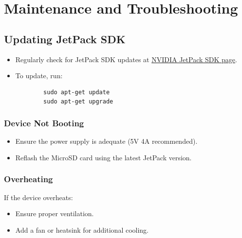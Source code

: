 %
%

\chapter{Maintenance and Troubleshooting}

\section{Updating JetPack SDK}
\begin{itemize}[label=--,left=1.5em]
	\item Regularly check for JetPack SDK updates at \href{https://developer.nvidia.com/embedded/jetpack}{NVIDIA JetPack SDK page}.
	\item To update, run:
	\begin{verbatim}
		sudo apt-get update
		sudo apt-get upgrade
	\end{verbatim}
\end{itemize}

\subsection{Device Not Booting}
\begin{itemize}
	\item Ensure the power supply is adequate (5V 4A recommended).
	\item Reflash the MicroSD card using the latest JetPack version.
\end{itemize}

\subsection{Overheating}
If the device overheats:
\begin{itemize}
	\item Ensure proper ventilation.
	\item Add a fan or heatsink for additional cooling.
\end{itemize}





